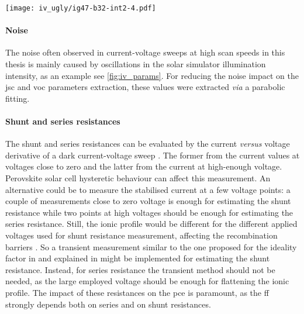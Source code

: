 	\begin{SCfigure}%
	\centering
	\texttt{[image: iv\_ugly/ig47-b32-int2-4.pdf]}
	\label{fig:iv_ugly}
\end{SCfigure}

	\paragraph{Noise}
	The noise often observed in current-voltage sweeps at high scan speeds in this thesis is mainly caused by oscillations in the solar simulator illumination intensity, as an example see \cref{fig:iv_params}.
	For reducing the noise impact on the \gls{jsc} and \gls{voc} parameters extraction, these values were extracted \textsl{via} a parabolic fitting.

	\paragraph{Shunt and series resistances} \label{resistances}
	The shunt and series resistances can be evaluated by the current \textsl{versus} voltage derivative of a dark current-voltage sweep \cite{Pysch2007}.
	The former from the current values at voltages close to zero and the latter from the current at high-enough voltage.
	Perovskite solar cell hysteretic behaviour can affect this measurement.
	An alternative could be to measure the stabilised current at a few voltage points: a couple of measurements close to zero voltage is enough for estimating the shunt resistance while two points at high voltages should be enough for estimating the series resistance.
	Still, the ionic profile would be different for the different applied voltages used for shunt resistance measurement, affecting the recombination barriers \cite{Moia2019,Pockett2017}.
	So a transient measurement similar to the one proposed for the ideality factor in \cite{Calado2019} and explained in  might be implemented for estimating the shunt resistance.
	Instead, for series resistance the transient method should not be needed, as the large employed voltage should be enough for flattening the ionic profile.
	The impact of these resistances on the \gls{pce} is paramount, as the \gls{ff} strongly depends both on series and on shunt resistances.

